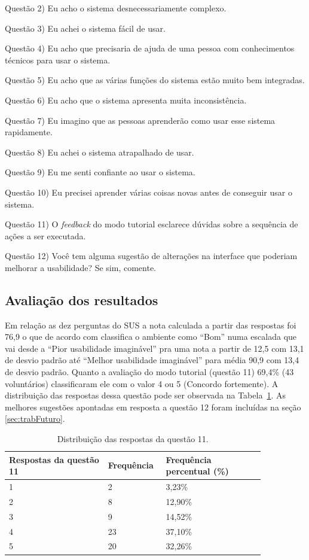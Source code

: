 Questão 2) Eu acho o sistema desnecessariamente complexo.

Questão 3) Eu achei o sistema fácil de usar.

Questão 4) Eu acho que precisaria de ajuda de uma pessoa com conhecimentos técnicos para usar o sistema.

Questão 5) Eu acho que as várias funções do sistema estão muito bem integradas.

Questão 6) Eu acho que o sistema apresenta muita inconsistência.

Questão 7) Eu imagino que as pessoas aprenderão como usar esse sistema rapidamente.

Questão 8) Eu achei o sistema atrapalhado de usar.

Questão 9) Eu me senti confiante ao usar o sistema.

Questão 10) Eu precisei aprender várias coisas novas antes de conseguir usar o sistema.

Questão 11) O \textit{feedback} do modo tutorial esclarece dúvidas sobre a sequência de ações a ser executada.

Questão 12) Você tem alguma sugestão de alterações na interface que poderiam melhorar a usabilidade? Se sim, comente.

\subsection{Avaliação dos resultados}
\label{sec:avaliacaoUsabilidde}

Em relação as dez perguntas do \acrshort{SUS} a nota calculada a partir das respostas foi 76,9 o que de acordo com \textcite{BangorAaron2009} classifica o ambiente como ``Bom'' numa escalada que vai desde a ``Pior usabilidade imaginável'' pra uma nota a partir de 12,5 com 13,1 de desvio padrão até ``Melhor usabilidade imaginável'' para média 90,9 com 13,4 de desvio padrão. 
Quanto a avaliação do modo tutorial (questão 11) 69,4\% (43 voluntários) classificaram ele com o valor 4 ou 5 (Concordo fortemente). A distribuição das respostas dessa questão pode ser observada na Tabela~\ref{tab:tabelaRespostasModoTutorial}. As melhores sugestões apontadas em resposta a questão 12 foram incluídas na seção \ref{sec:trabFuturo}.

\begin{table}[!ht]
\begin{center}
\caption{Distribuição das respostas da questão 11.}
\label{tab:tabelaRespostasModoTutorial}
\begin{tabular}{|p{0.35\linewidth}|p{0.15\linewidth}|p{0.35\linewidth}|}
\hline
\textbf{Respostas da questão 11} & \textbf{Frequência} & \textbf{Frequência percentual (\%)}\\
\hline\hline
1 & 2 & 3,23\%\\
2 & 8 & 12,90\%\\
3 & 9 & 14,52\%\\
4 & 23 & 37,10\%\\
5 & 20 & 32,26\%\\
\hline
\end{tabular}
\end{center}
\end{table}

